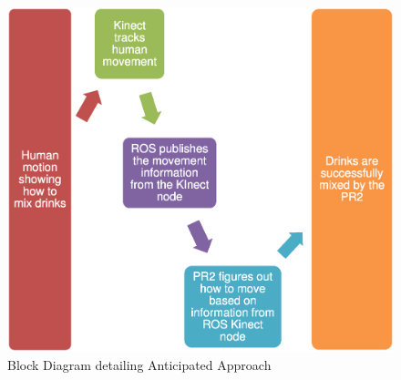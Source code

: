 \documentclass{sig-alternate}
\begin{document}
\begin{figure}[htb!]
	\begin{center}
		\includegraphics[width=0.9\linewidth]{flowchart}
	\end{center}
	\vspace{-12pt}
	\caption{Block Diagram detailing Anticipated Approach}
	\label{fig:some_graph}
\end{figure}
\end{document}
